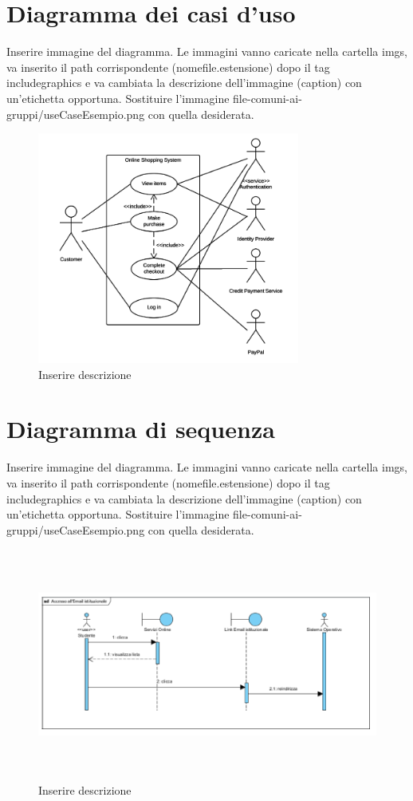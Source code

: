 \section{Diagramma dei casi d'uso}

Inserire immagine del diagramma. Le immagini vanno caricate nella cartella imgs, va inserito il path corrispondente (nomefile.estensione) dopo il tag includegraphics e va cambiata la descrizione dell'immagine (caption) con un'etichetta opportuna. Sostituire l'immagine file-comuni-ai-gruppi/useCaseEsempio.png con quella desiderata.

\begin{figure}
	\centering
	\includegraphics[height=3in]{imgs/file-comuni-ai-gruppi/useCaseEsempio.png}
	\caption{Inserire descrizione}
	\label{fig:prova}
\end{figure}

\section{Diagramma di sequenza}

Inserire immagine del diagramma. Le immagini vanno caricate nella cartella imgs, va inserito il path corrispondente (nomefile.estensione) dopo il tag includegraphics e va cambiata la descrizione dell'immagine (caption) con un'etichetta opportuna. Sostituire l'immagine file-comuni-ai-gruppi/useCaseEsempio.png con quella desiderata.

\begin{figure}
	\centering
	\includegraphics[height=3in,width=5in]{imgs/file-comuni-ai-gruppi/SequenceDgEsempio.png}
	\caption{Inserire descrizione}
	\label{fig:prova}
\end{figure}

